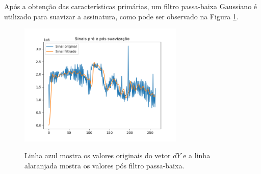    Após a obtenção das características primárias, um filtro passa-baixa Gaussiano é utilizado para suavizar a assinatura, como pode ser observado na Figura \ref{fig:framediff-passa-baixa}. %




\begin{figure}[h]
\centering
	\caption{Linha azul mostra os valores originais do vetor $dY$ e a linha alaranjada mostra os valores pós filtro passa-baixa.}
  	\includegraphics[width=0.7\textwidth]{dados/figuras/filtro_passa_baixa}
  \label{fig:framediff-passa-baixa}
\end{figure}



